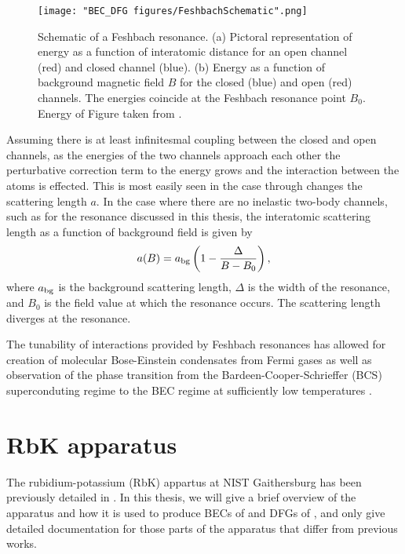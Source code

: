 \begin{figure}
	\texttt{[image: "BEC\_DFG figures/FeshbachSchematic".png]}
\caption{Schematic of a Feshbach resonance. (a) Pictoral representation of energy as a function of interatomic distance for an open channel (red) and closed channel (blue). (b) Energy as a function of background magnetic field $B$ for the closed (blue) and open (red) channels. The energies coincide at the Feshbach resonance point $B_0$. Energy of Figure taken from \cite{KetterleDFG}.}
\label{fig:FeshbachSchematic}
\end{figure}

Assuming there is at least infinitesmal coupling between the closed and open channels, as the energies of the two channels approach each other the perturbative correction term to the energy grows and the interaction between the atoms is effected. This is most easily seen in the \swave{} case through changes the scattering length $a$. In the case where there are no inelastic two-body channels, such as for the \K{} resonance discussed in this thesis, the interatomic scattering length as a function of background field is given by\cite{Chin10}
\begin{equation}
a(B)=a_{\rm{bg}}\left(1-\frac{\Delta}{B-B_0}\right),
\label{eqn:feshbach}
\end{equation}
where $a_{\rm{bg}}$ is the background scattering length, $\Delta$ is the width of the resonance, and $B_0$ is the field value at which the resonance occurs. The scattering length diverges at the resonance.

The tunability of interactions provided by Feshbach resonances has allowed for creation of molecular Bose-Einstein condensates from Fermi gases \cite{Greiner03,Zwierlein03, Jochim03} as well as observation of the phase transition from the Bardeen-Cooper-Schrieffer (BCS) superconduting regime to the BEC regime at sufficiently low temperatures \cite{Bartenstein04, Bourdel04, Zwierlein04, Regal04}.

\section{RbK apparatus}

The rubidium-potassium (RbK) appartus at NIST Gaithersburg has been previously detailed in \cite{Lin2009,KarinaThesis, LaurenThesis}. In this thesis, we will give a brief overview of the apparatus and how it is used to produce BECs of \Rb{} and DFGs of \K{}, and only give detailed documentation for those parts of the apparatus that differ from previous works. 

